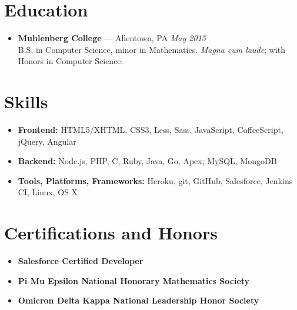 \documentclass[11pt]{article}
\begin{document}
\section*{Education}
\begin{itemize}
  \item \textbf{Muhlenberg College} --- Allentown, PA \hfill {\em May 2015} \\
    B.S. in Computer Science, minor in Mathematics. {\em Magna cum laude}; with Honors in Computer Science.
\end{itemize}



\section*{Skills}
\begin{itemize}
  \item \textbf{Frontend:} HTML5/XHTML, CSS3, Less, Sass, JavaScript, CoffeeScript, jQuery, Angular
  \item \textbf{Backend:} Node.js, PHP, C, Ruby, Java, Go, Apex; MySQL, MongoDB
  \item \textbf{Tools, Platforms, Frameworks:} Heroku, git, GitHub, Salesforce, Jenkins CI, Linux, OS X
\end{itemize}



\section*{Certifications and Honors}
\begin{itemize}
  \item \textbf{Salesforce Certified Developer}
  \item \textbf{Pi Mu Epsilon National Honorary Mathematics Society}
  \item \textbf{Omicron Delta Kappa National Leadership Honor Society}
\end{itemize}
\end{document}
